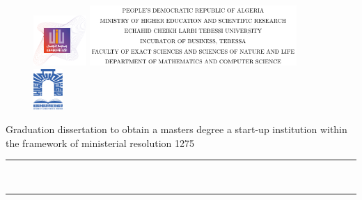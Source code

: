 \begin{titlepage}
	\begin{figure}
		\centering
		\begin{adjustbox}{valign=c}
			\includegraphics[width=0.18\textwidth]{./images/incubator.png}
		\end{adjustbox}
		\hfill
		\begin{adjustbox}{valign=c}
			\includegraphics[width=0.7\textwidth]{./images/title.png}
		\end{adjustbox}
		\hfill
		\begin{adjustbox}{valign=c}
			\includegraphics[width=0.1\textwidth]{./images/university.png}
		\end{adjustbox}
		\vspace{1cm}
	\end{figure}
	\begin{center}
		\Large{Graduation dissertation to obtain a masters degree a start-up institution within the framework of ministerial resolution 1275}\\[0.5cm]
		\rule{\textwidth}{0.075cm}\\[0.4cm]
		\textsc{\huge \bfseries \@title}
		\rule{\textwidth}{0.075cm}\\[2cm]

\end{center}
\end{titlepage}
